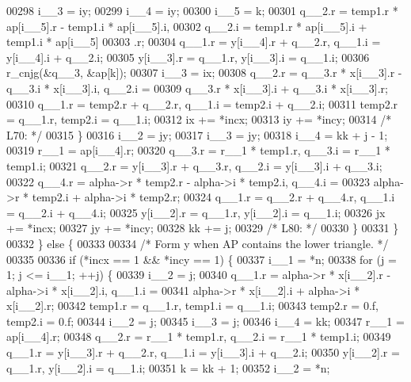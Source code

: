\begin{DoxyCode}
00298             i\_\_3 = iy;
00299             i\_\_4 = iy;
00300             i\_\_5 = k;
00301             q\_\_2.r = temp1.r * ap[i\_\_5].r - temp1.i * ap[i\_\_5].i, 
00302                 q\_\_2.i = temp1.r * ap[i\_\_5].i + temp1.i * ap[i\_\_5]
00303                 .r;
00304             q\_\_1.r = y[i\_\_4].r + q\_\_2.r, q\_\_1.i = y[i\_\_4].i + q\_\_2.i;
00305             y[i\_\_3].r = q\_\_1.r, y[i\_\_3].i = q\_\_1.i;
00306             r\_cnjg(&q\_\_3, &ap[k]);
00307             i\_\_3 = ix;
00308             q\_\_2.r = q\_\_3.r * x[i\_\_3].r - q\_\_3.i * x[i\_\_3].i, q\_\_2.i =
00309                  q\_\_3.r * x[i\_\_3].i + q\_\_3.i * x[i\_\_3].r;
00310             q\_\_1.r = temp2.r + q\_\_2.r, q\_\_1.i = temp2.i + q\_\_2.i;
00311             temp2.r = q\_\_1.r, temp2.i = q\_\_1.i;
00312             ix += *incx;
00313             iy += *incy;
00314 \textcolor{comment}{/* L70: */}
00315         \}
00316         i\_\_2 = jy;
00317         i\_\_3 = jy;
00318         i\_\_4 = kk + j - 1;
00319         r\_\_1 = ap[i\_\_4].r;
00320         q\_\_3.r = r\_\_1 * temp1.r, q\_\_3.i = r\_\_1 * temp1.i;
00321         q\_\_2.r = y[i\_\_3].r + q\_\_3.r, q\_\_2.i = y[i\_\_3].i + q\_\_3.i;
00322         q\_\_4.r = alpha->r * temp2.r - alpha->i * temp2.i, q\_\_4.i = 
00323             alpha->r * temp2.i + alpha->i * temp2.r;
00324         q\_\_1.r = q\_\_2.r + q\_\_4.r, q\_\_1.i = q\_\_2.i + q\_\_4.i;
00325         y[i\_\_2].r = q\_\_1.r, y[i\_\_2].i = q\_\_1.i;
00326         jx += *incx;
00327         jy += *incy;
00328         kk += j;
00329 \textcolor{comment}{/* L80: */}
00330         \}
00331     \}
00332     \} \textcolor{keywordflow}{else} \{
00333 
00334 \textcolor{comment}{/*        Form  y  when AP contains the lower triangle. */}
00335 
00336     \textcolor{keywordflow}{if} (*incx == 1 && *incy == 1) \{
00337         i\_\_1 = *n;
00338         \textcolor{keywordflow}{for} (j = 1; j <= i\_\_1; ++j) \{
00339         i\_\_2 = j;
00340         q\_\_1.r = alpha->r * x[i\_\_2].r - alpha->i * x[i\_\_2].i, q\_\_1.i =
00341              alpha->r * x[i\_\_2].i + alpha->i * x[i\_\_2].r;
00342         temp1.r = q\_\_1.r, temp1.i = q\_\_1.i;
00343         temp2.r = 0.f, temp2.i = 0.f;
00344         i\_\_2 = j;
00345         i\_\_3 = j;
00346         i\_\_4 = kk;
00347         r\_\_1 = ap[i\_\_4].r;
00348         q\_\_2.r = r\_\_1 * temp1.r, q\_\_2.i = r\_\_1 * temp1.i;
00349         q\_\_1.r = y[i\_\_3].r + q\_\_2.r, q\_\_1.i = y[i\_\_3].i + q\_\_2.i;
00350         y[i\_\_2].r = q\_\_1.r, y[i\_\_2].i = q\_\_1.i;
00351         k = kk + 1;
00352         i\_\_2 = *n;

\end{DoxyCode}
